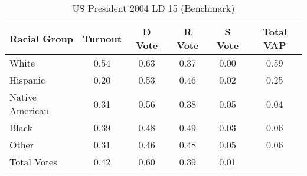 \begin{table}[htb]
\begin{center}
\caption{US President 2004 LD 15 (Benchmark)}
\label{pres04_vap_ld_15_benchmark}
\begin{tabular}{lccccc}
  \hline
Racial Group & Turnout & D Vote & R Vote & S Vote & Total VAP \\ 
  \hline
White & 0.54 & 0.63 & 0.37 & 0.00 & 0.59 \\ 
  Hispanic & 0.20 & 0.53 & 0.46 & 0.02 & 0.25 \\ 
  Native American & 0.31 & 0.56 & 0.38 & 0.05 & 0.04 \\ 
  Black & 0.39 & 0.48 & 0.49 & 0.03 & 0.06 \\ 
  Other & 0.31 & 0.46 & 0.48 & 0.05 & 0.06 \\ 
  Total Votes & 0.42 & 0.60 & 0.39 & 0.01 &  \\ 
   \hline
\end{tabular}
\end{center}
\end{table}

